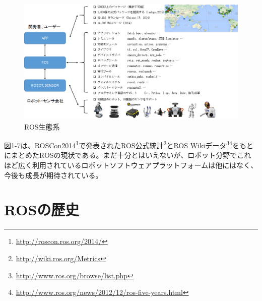 \begin{figure}[h]
  \centering
  \includegraphics[width=\columnwidth]{pictures/chapter1/pic_01_03.png}
  \caption{ROS生態系}
\end{figure}

図1-7は、ROSCon2014\footnote{\url{http://roscon.ros.org/2014/}}で発表されたROS公式統計\footnote{\url{http://wiki.ros.org/Metrics}}とROS Wikiデータ\footnote{\url{http://www.ros.org/browse/list.php}}\footnote{\url{http://www.ros.org/news/2012/12/ros-five-years.html}}をもとにまとめたROSの現状である。まだ十分とはいえないが、ロボット分野でこれほど広く利用されているロボットソフトウェアプラットフォームは他にはなく、今後も成長が期待されている。

\section{ROSの歴史}

